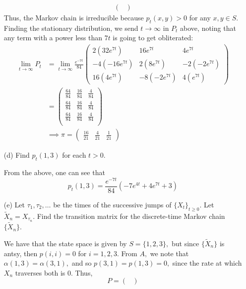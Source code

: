 \documentclass[11pt]{article}
\begin{document}
\begin{enumerate}
\begin{solution}
\begin{align*}
\begin{pmatrix}
\end{pmatrix}
    \end{align*}
    Thus, the Markov chain is irreducible because $p_t(x,y) >0$ for any $x,y \in S.$ Finding the stationary distribution, we send $t\to \infty$ in $P_t$ above, noting that any term with a power less than $7t$ is going to get obliterated:
\begin{align*}
    \lim_{t\to \infty}P_t &= \lim_{t\to \infty} \frac{e^{-7t}}{84}
\begin{pmatrix} 
2\left(32 e^{7t}\right) & 16 e^{7t}& 4e^{7t} \\
-4\left( - 16 e^{7t}\right) & 2\left(8 e^{7t} \right) & -2\left(- 2 e^{7t} \right) \\
16\left(4 e^{7t}\right) & -8\left(- 2 e^{7t} \right) & 4\left( e^{7t}\right)
\end{pmatrix}\\
&= \begin{pmatrix}
    \frac{64}{84} & \frac{16}{84} & \frac{4}{84}\\
    \frac{64}{84} & \frac{16}{84} & \frac{4}{84}\\
    \frac{64}{84} & \frac{16}{84} & \frac{4}{84}\\
\end{pmatrix}\\
&\implies \boxed{\pi = \begin{pmatrix}
    \frac{16}{21} & \frac{4}{21} & \frac{1}{21}
\end{pmatrix}}
\end{align*}
\end{solution}
    \item[(d)] Find \(p_t(1,3)\) for each \(t > 0\).
    \begin{solution}
        From the above, one can see that 
        \[\boxed{p_t (1,3) = \frac{e^{-7t}}{84}(-7 e^{4t} + 4 e^{7t} + 3 )}\]
    \end{solution}
    \item[(e)] Let \(\tau_1, \tau_2, \ldots\) be the times of the successive jumps of \(\{X_t\}_{t \geq 0}\). Let \(\tilde{X}_n = X_{\tau_n}\). Find the transition matrix for the discrete-time Markov chain \(\{\tilde{X}_n\}\).
\begin{solution}
    We have that the state space is given by $S = \{1,2,3\},$ but since $\{\tilde{X}_n\}$ is antsy, then $p(i,i) = 0$ for $i = 1,2,3.$ From $A,$ we note that $\alpha(1,3) = \alpha(3,1),$ and so $p(3,1) = p(1,3) = 0,$ since the rate at which $X_n$ traverses both is $0.$ Thus, 
    \[P = \begin{pmatrix}

\end{pmatrix}\]
\end{solution}
\end{enumerate}
\end{document}
